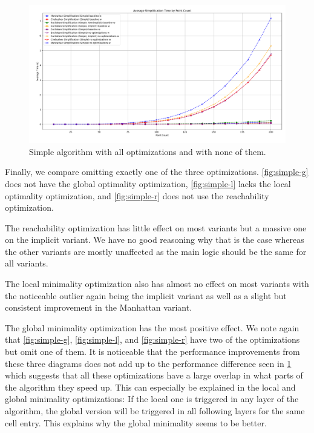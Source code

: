 \begin{figure}[b]
  \centering
	\includegraphics[scale=0.4]{./figures/simple-noopt.png}
  \caption{Simple algorithm with all optimizations and with none of them.}
  \label{fig:simple-noopt}
\end{figure}

Finally, we compare omitting exactly one of the three optimizations. \cref{fig:simple-g} does not have the global optimality optimization, \cref{fig:simple-l} lacks the local optimality optimization, and \cref{fig:simple-r} does not use the reachability optimization. 

The reachability optimization has little effect on most variants but a massive one on the implicit variant. We have no good reasoning why that is the case whereas the other variants are mostly unaffected as the main logic should be the same for all variants.

The local minimality optimization also has almost no effect on most variants with the noticeable outlier again being the implicit variant as well as a slight but consistent improvement in the Manhattan variant.

The global minimality optimization has the most positive effect. We note again that \cref{fig:simple-g}, \cref{fig:simple-l}, and \cref{fig:simple-r} have two of the optimizations but omit one of them. It is noticeable that the performance improvements from these three diagrams does not add up to the performance difference seen in \cref{fig:simple-noopt} which suggests that all these optimizations have a large overlap in what parts of the algorithm they speed up. This can especially be explained in the local and global minimality optimizations: If the local one is triggered in any layer of the algorithm, the global version will be triggered in all following layers for the same cell entry. This explains why the global minimality seems to be better. 

